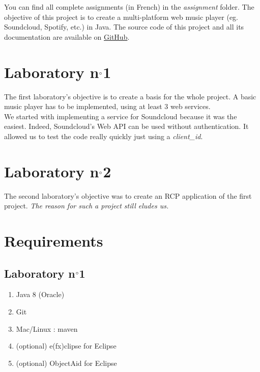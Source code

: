 \documentclass{report}
\begin{document}
You can find all complete assignments (in French) in the \textit{assignment} folder. The objective of this project is to create a multi-platform web music player (eg. Soundcloud, Spotify, etc.) in Java. The source code of this project and all its documentation are available on \href{https://github.com/cnamal/arch-LOG8430}{GitHub}.

\section{Laboratory n$\degree$1}

The first laboratory's objective is to create a basis for the whole project. A basic music player has to be implemented, using at least 3 web services. \\

We started with implementing a service for Soundcloud because it was the easiest. Indeed, Soundcloud's Web API can be used without authentication. It allowed us to test the code really quickly just using a \textit{client\_id}. 

\section{Laboratory n$\degree$2}

The second laboratory's objective was to create an RCP application of the first project. \scriptsize \textit{The reason for such a project still eludes us.} \normalsize

\section{Requirements}

\subsection{Laboratory n$\degree$1}

\begin{enumerate}
\item Java 8 (Oracle)
\item Git
\item Mac/Linux : maven
\item (optional) e(fx)clipse for Eclipse
\item (optional) ObjectAid for Eclipse
\end{enumerate}
\end{document}

